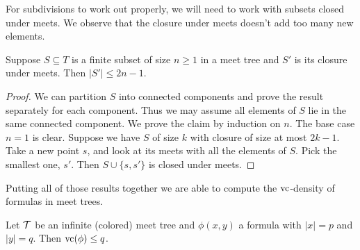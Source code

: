 For subdivisions to work out properly, we will need to work with subsets closed under meets. We observe that the closure under meets doesn't add too many new elements.

\begin{Lemma} \label{lm_meet}
  Suppose $S \subseteq T$ is a finite subset of size $n \geq 1$ in a meet tree and $S'$ is its closure under meets. Then $|S'| \leq 2n - 1$.
\end{Lemma}
\begin{proof}
  We can partition $S$ into connected components and prove the result separately for each component. Thus we may assume all elements of $S$ lie in the same connected component. We prove the claim by induction on $n$. The base case $n = 1$ is clear. Suppose we have $S$ of size $k$ with closure of size at most $2k - 1$. Take a new point $s$, and look at its meets with all the elements of $S$. Pick the smallest one, $s'$. Then $S \cup \{s, s'\}$ is closed under meets.
\end{proof}

Putting all of those results together we are able to compute the $\operatorname{vc}$-density of formulas in meet trees.

\begin{Theorem}
  Let $\operatorname{\mathcal T}$ be an infinite (colored) meet tree and $\phi(x, y)$ a formula with $|x| = p$ and $|y| = q$. Then $\operatorname{vc}(\phi) \leq q$.
\end{Theorem}

